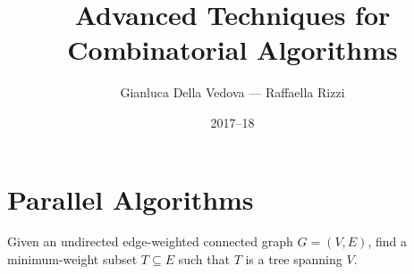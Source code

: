 \documentclass[12pt]{article}
\begin{document}
\title{Advanced Techniques for Combinatorial Algorithms}
\author{Gianluca Della Vedova --- Raffaella Rizzi}
\date{2017--18}

\maketitle


\section{Parallel Algorithms}

Given an undirected edge-weighted connected graph $G = (V, E)$, find a minimum-weight
subset $T \subseteq E$ such that $T$ is a tree spanning $V$.










\end{document}

